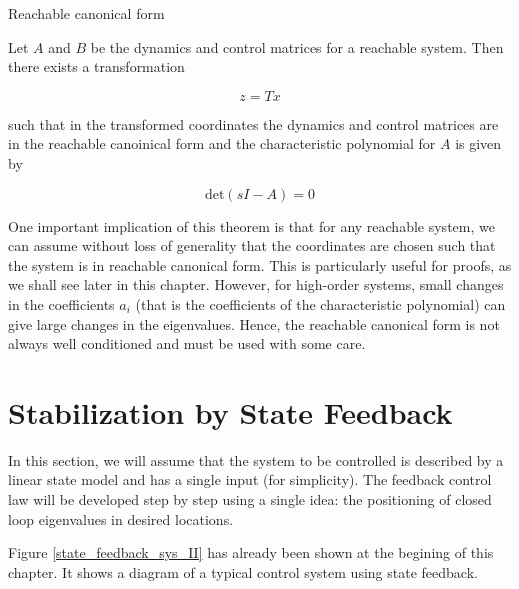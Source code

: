 \begin{framed}
\theoremstyle{theorem}
\begin{theorem}{Reachable canonical form}

Let $A$ and $B$ be the dynamics and control matrices for a reachable system. Then there exists a transformation

\begin{equation}
z = Tx \nonumber
\end{equation}

such that in the transformed coordinates  the dynamics and control matrices are in the reachable 
canoinical form and the characteristic polynomial for $A$ is given by

\begin{equation}
\text{det}(sI-A) = 0 \nonumber
\end{equation}

\end{theorem}
\end{framed}

One important implication of this theorem is that for any reachable system, we
can assume without loss of generality that the coordinates are chosen such that the
system is in reachable canonical form. This is particularly useful for proofs, as we
shall see later in this chapter. However, for high-order systems, small changes in
the coefficients $a_i$ (that is the coefficients of the characteristic polynomial) can give large changes in the eigenvalues. Hence, the reachable canonical form is not always well conditioned and must be used with some care.


\section{Stabilization by State Feedback}

In this section, we will assume that the
system to be controlled is described by a linear state model and has a single input
(for simplicity). The feedback control law will be developed step by step using a
single idea: the positioning of closed loop eigenvalues in desired locations.

Figure \ref{state_feedback_sys_II} has already been shown at the begining of this chapter. It shows a diagram of a typical control system using state feedback.


